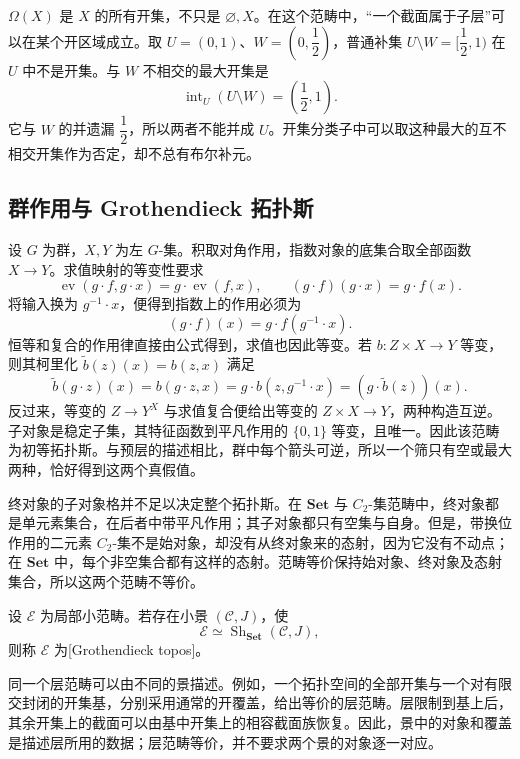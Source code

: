 \ProseParagraphBreak
\(\Omega(X)\) 是 \(X\) 的所有开集，不只是 \(\varnothing,X\)。在这个范畴中，“一个截面属于子层”可以在某个开区域成立。取 \(U=(0,1)\)、\(W=(0,\dfrac12)\)，普通补集 \(U\setminus W=[\dfrac12,1)\) 在 \(U\) 中不是开集。与 \(W\) 不相交的最大开集是
\[
	\operatorname{int}_U(U\setminus W)=(\dfrac12,1).
\]
它与 \(W\) 的并遗漏 \(\dfrac12\)，所以两者不能并成 \(U\)。开集分类子中可以取这种最大的互不相交开集作为否定，却不总有布尔补元。

\subsection{群作用与 Grothendieck 拓扑斯}
\label{b4:subsec:E03:02}

\begin{example}\label{b4:exm:group-set-topos}
	设 \(G\) 为群，\(X,Y\) 为左 \(G\)-集。积取对角作用，指数对象的底集合取全部函数 \(X\to Y\)。求值映射的等变性要求
	\[
		\operatorname{ev}(g\cdot f,g\cdot x)=g\cdot\operatorname{ev}(f,x), \qquad (g\cdot f)(g\cdot x)=g\cdot f(x).
	\]
	将输入换为 \(g^{-1}\cdot x\)，便得到指数上的作用必须为
	\[
		(g\cdot f)(x)=g\cdot f(g^{-1}\cdot x).
	\]
	恒等和复合的作用律直接由公式得到，求值也因此等变。若 \(b:Z\times X\to Y\) 等变，则其柯里化 \(\widetilde b(z)(x)=b(z,x)\) 满足
	\[
		\widetilde b(g\cdot z)(x) =b(g\cdot z,x)=g\cdot b(z,g^{-1}\cdot x) =(g\cdot\widetilde b(z))(x).
	\]
	反过来，等变的 \(Z\to Y^X\) 与求值复合便给出等变的 \(Z\times X\to Y\)，两种构造互逆。子对象是稳定子集，其特征函数到平凡作用的 \(\{0,1\}\) 等变，且唯一。因此该范畴为初等拓扑斯。与预层的描述相比，群中每个箭头可逆，所以一个筛只有空或最大两种，恰好得到这两个真假值。
\end{example}

终对象的子对象格并不足以决定整个拓扑斯。在 \(\mathbf{Set}\) 与 \(C_2\)-集范畴中，终对象都是单元素集合，在后者中带平凡作用；其子对象都只有空集与自身。但是，带换位作用的二元素 \(C_2\)-集不是始对象，却没有从终对象来的态射，因为它没有不动点；在 \(\mathbf{Set}\) 中，每个非空集合都有这样的态射。范畴等价保持始对象、终对象及态射集合，所以这两个范畴不等价。

\begin{definition}\label{b4:def:grothendieck-topos}
	设 \(\mathcal E\) 为局部小范畴。若存在小景 \((\mathcal C,J)\)，使
	\[
		\mathcal E\simeq\operatorname{Sh}_{\mathbf{Set}}(\mathcal C,J),
	\]
	则称 \(\mathcal E\) 为[Grothendieck topos]。
\end{definition}

同一个层范畴可以由不同的景描述。例如，一个拓扑空间的全部开集与一个对有限交封闭的开集基，分别采用通常的开覆盖，给出等价的层范畴。层限制到基上后，其余开集上的截面可以由基中开集上的相容截面族恢复。因此，景中的对象和覆盖是描述层所用的数据；层范畴等价，并不要求两个景的对象逐一对应。

